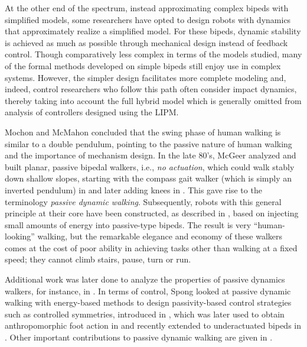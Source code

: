 At the other end of the spectrum, instead approximating complex bipeds with
simplified models, some researchers have opted to design robots with dynamics
that approximately realize a simplified model.
%
For these bipeds, dynamic stability is achieved as much as possible through
mechanical design instead of feedback control.
%
Though comparatively less complex in terms of the models studied, many of the
formal methods developed on simple bipeds still enjoy use in complex systems.
%
However, the simpler design facilitates more complete modeling and, indeed,
control researchers who follow this path often consider impact dynamics, thereby
taking into account the full hybrid model which is generally omitted from
analysis of controllers designed using the LIPM.
%

Mochon and McMahon \cite{Mochon1980} concluded that the swing phase of human
walking is similar to a double pendulum, pointing to the passive nature of human
walking and the importance of mechanism design.
%
In the late 80's, McGeer analyzed and built planar, passive bipedal walkers,
i.e., {\em no actuation}, which could walk stably down shallow slopes, starting
with the compass gait walker (which is simply an inverted pendulum) in
\cite{McGeer1990} and later adding knees in \cite{McGeer1990a}.
%
This gave rise to the terminology {\em passive dynamic walking}.
%
Subsequently, robots with this general principle at their core have been
constructed, as described in \cite{Collins2005}, based on injecting small
amounts of energy into passive-type bipeds.
%
The result is very ``human-looking'' walking, but the remarkable elegance and
economy of these walkers comes at the cost of poor ability in achieving tasks
other than walking at a fixed speed;
%
they cannot climb stairs, pause, turn or run.
%

Additional work was later done to analyze the properties of passive dynamics
walkers, for instance, in \cite{Espiau1994,Garcia1998,Borzova2004}.
%
In terms of control, Spong \cite{Spong1999} looked at passive dynamic walking with
energy-based methods to design passivity-based control strategies such as
controlled symmetries, introduced in \cite{Spong2005}, which was later used to
obtain anthropomorphic foot action in \cite{Sinnet2009,Sinnet2009a} and recently
extended to underactuated bipeds in \cite{Hu2011}.
Other important contributions to passive dynamic walking are given in
\cite{Kuo1999,Kuo2002,Anderson2005,Wisse2007}.
%


